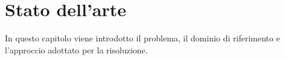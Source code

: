 \chapter{Stato dell'arte}

In questo capitolo viene introdotto il problema, il dominio di
riferimento e l'approccio adottato per la risoluzione.
